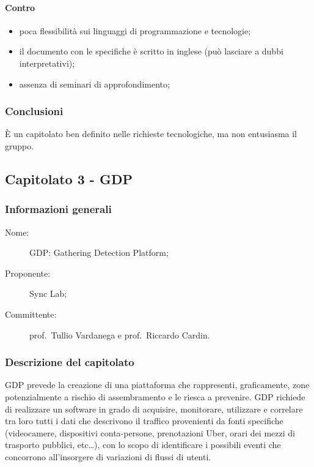 \paragraph*{Contro}
\begin{itemize}
	\item poca flessibilità sui linguaggi di programmazione e tecnologie;
	\item il documento con le specifiche è scritto in inglese (può lasciare a dubbi interpretativi);
	\item assenza di seminari di approfondimento;
\end{itemize}
\subsubsection{Conclusioni}
È un capitolato ben definito nelle richieste tecnologiche, ma non entusiasma il gruppo.

\subsection{Capitolato 3 - GDP}
\subsubsection{Informazioni generali}
\begin{description}
	\item[Nome:] GDP: Gathering Detection Platform;
	\item[Proponente:] Sync Lab;
	\item[Committente:] prof.~Tullio Vardanega e prof.~Riccardo Cardin.
\end{description}
\subsubsection{Descrizione del capitolato}
GDP prevede la creazione di una piattaforma che rappresenti, graficamente, zone potenzialmente a rischio di assembramento e le riesca a prevenire. GDP richiede di realizzare un software in grado di acquisire, monitorare, utilizzare e correlare tra loro tutti i dati che descrivono il traffico provenienti da fonti specifiche (videocamere, dispositivi conta-persone, prenotazioni Uber, orari dei mezzi di trasporto pubblici, etc\dots), con lo scopo di identificare i possibili eventi che concorrono all'insorgere di variazioni di flussi di utenti.
